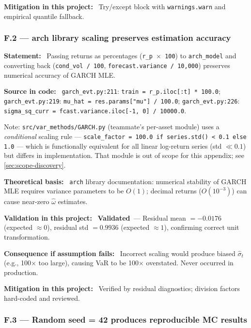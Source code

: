 \documentclass[11pt,a4paper]{article}
\newcommand{\asmfield}[1]{\medskip\noindent\textbf{#1:}\ }
\newcommand{\code}[1]{\texttt{#1}}
\newcommand{\validated}{\textbf{Validated}}
\begin{document}
\asmfield{Mitigation in this project}
Try/except block with \code{warnings.warn} and empirical quantile fallback.

\subsubsection{F.2 --- arch library scaling preserves estimation accuracy}\label{asm:F2}

\asmfield{Statement}
Passing returns as percentages (\code{r\_p $\times$ 100}) to \code{arch\_model}
and converting back (\code{cond\_vol / 100}, \code{forecast.variance / 10{,}000})
preserves numerical accuracy of GARCH MLE.

\asmfield{Source in code}
\code{garch\_evt.py:211}: \lstinline|train = r_p.iloc[:t] * 100.0|;
\code{garch\_evt.py:219}: \lstinline|mu_hat = res.params["mu"] / 100.0|;
\code{garch\_evt.py:226}: \lstinline|sigma_sq_curr = fcast.variance.iloc[-1, 0] / 10000.0|.

Note: \code{src/var\_methods/GARCH.py} (teammate's per-asset module) uses a
\emph{conditional} scaling rule --- \lstinline|scale_factor = 100.0 if series.std() < 0.1 else 1.0| --- which is functionally equivalent for all linear log-return
series (std $\ll 0.1$) but differs in implementation.  That module is out of
scope for this appendix; see \cref{sec:scope-discovery}.

\asmfield{Theoretical basis}
\code{arch} library documentation: numerical stability of GARCH MLE
requires variance parameters to be $O(1)$; decimal returns ($O(10^{-3})$)
can cause near-zero $\hat{\omega}$ estimates.

\asmfield{Validation in this project}
\validated\ --- Residual mean $= -0.0176$ (expected $\approx 0$), residual
std $= 0.9936$ (expected $\approx 1$), confirming correct unit transformation.

\asmfield{Consequence if assumption fails}
Incorrect scaling would produce biased $\hat{\sigma}_t$ (e.g., 100$\times$
too large), causing VaR to be 100$\times$ overstated. Never occurred in
production.

\asmfield{Mitigation in this project}
Verified by residual diagnostics; division factors hard-coded and reviewed.

\subsubsection{F.3 --- Random seed = 42 produces reproducible MC results}\label{asm:F3}
\end{document}
